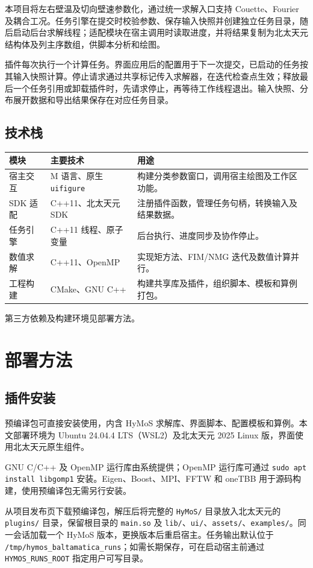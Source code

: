 \documentclass[UTF8,a4paper,11pt,fontset=fandol]{ctexart}
\newcommand{\code}[1]{\nolinkurl{#1}}
\begin{document}
本项目将左右壁温及切向壁速参数化，通过统一求解入口支持 Couette、Fourier 及耦合工况。任务引擎在提交时校验参数、保存输入快照并创建独立任务目录，随后启动后台求解线程；适配模块在宿主调用时读取进度，并将结果复制为北太天元结构体及列主序数组，供脚本分析和绘图。

插件每次执行一个计算任务。界面应用后的配置用于下一次提交，已启动的任务按其输入快照计算。停止请求通过共享标记传入求解器，在迭代检查点生效；释放最后一个任务引用或卸载插件时，先请求停止，再等待工作线程退出。输入快照、分布展开数据和导出结果保存在对应任务目录。

\subsection{技术栈}
\begin{center}\small
\begin{tabularx}{\textwidth}{@{}p{26mm}p{45mm}Y@{}}
\toprule
模块 & 主要技术 & 用途\\
\midrule
宿主交互 & M 语言、原生 \texttt{uifigure} & 构建分类参数窗口，调用宿主绘图及工作区功能。\\
SDK 适配 & C++11、北太天元 SDK & 注册插件函数，管理任务句柄，转换输入及结果数据。\\
任务引擎 & C++11 线程、原子变量 & 后台执行、进度同步及协作停止。\\
数值求解 & C++11、OpenMP & 实现矩方法、FIM/NMG 迭代及数值计算并行。\\
工程构建 & CMake、GNU C++ & 构建共享库及插件，组织脚本、模板和算例打包。\\
\bottomrule
\end{tabularx}
\end{center}
第三方依赖及构建环境见部署方法。
\section{部署方法}
\subsection{插件安装}
预编译包可直接安装使用，内含 HyMoS 求解库、界面脚本、配置模板和算例。本文部署环境为 Ubuntu 24.04.4 LTS（WSL2）及北太天元 2025 Linux 版，界面使用北太天元原生组件。

GNU C/C++ 及 OpenMP 运行库由系统提供；OpenMP 运行库可通过 \texttt{sudo apt install libgomp1} 安装。Eigen、Boost、MPI、FFTW 和 oneTBB 用于源码构建，使用预编译包无需另行安装。

从项目发布页下载预编译包，解压后将完整的 \code{HyMoS/} 目录放入北太天元的 \code{plugins/} 目录，保留根目录的 \code{main.so} 及 \code{lib/}、\code{ui/}、\code{assets/}、\code{examples/}。同一会话加载一个 HyMoS 版本，更换版本后重启宿主。任务输出默认位于 \code{/tmp/hymos_baltamatica_runs}；如需长期保存，可在启动宿主前通过 \code{HYMOS_RUNS_ROOT} 指定用户可写目录。
\end{document}
